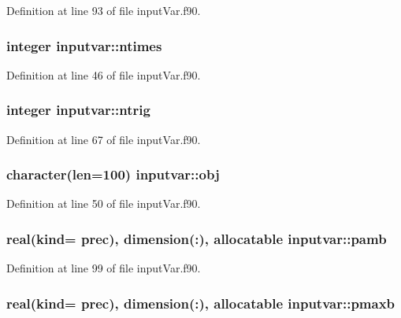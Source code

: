 Definition at line 93 of file input\-Var.\-f90.

\hypertarget{classinputvar_a98d384e0347fb055110c18572dbdb522}{
\subsubsection[{ntimes}]{\setlength{\rightskip}{0pt plus 5cm}integer inputvar\-::ntimes}}\label{classinputvar_a98d384e0347fb055110c18572dbdb522}


Definition at line 46 of file input\-Var.\-f90.

\hypertarget{classinputvar_ae4403f5c5b16bf2cbd2b607a87e5ee9a}{
\subsubsection[{ntrig}]{\setlength{\rightskip}{0pt plus 5cm}integer inputvar\-::ntrig}}\label{classinputvar_ae4403f5c5b16bf2cbd2b607a87e5ee9a}


Definition at line 67 of file input\-Var.\-f90.

\hypertarget{classinputvar_ab5d2f467a214e31204c18a24582b81bb}{
\subsubsection[{obj}]{\setlength{\rightskip}{0pt plus 5cm}character(len=100) inputvar\-::obj}}\label{classinputvar_ab5d2f467a214e31204c18a24582b81bb}


Definition at line 50 of file input\-Var.\-f90.

\hypertarget{classinputvar_a241f8b7a07fdc252022c2ef56cfded42}{
\subsubsection[{pamb}]{\setlength{\rightskip}{0pt plus 5cm}real(kind= prec), dimension(\-:), allocatable inputvar\-::pamb}}\label{classinputvar_a241f8b7a07fdc252022c2ef56cfded42}


Definition at line 99 of file input\-Var.\-f90.

\hypertarget{classinputvar_a29e37a8460969d1438ed9aeb5d37d798}{
\subsubsection[{pmaxb}]{\setlength{\rightskip}{0pt plus 5cm}real(kind= prec), dimension(\-:), allocatable inputvar\-::pmaxb}}\label{classinputvar_a29e37a8460969d1438ed9aeb5d37d798}


